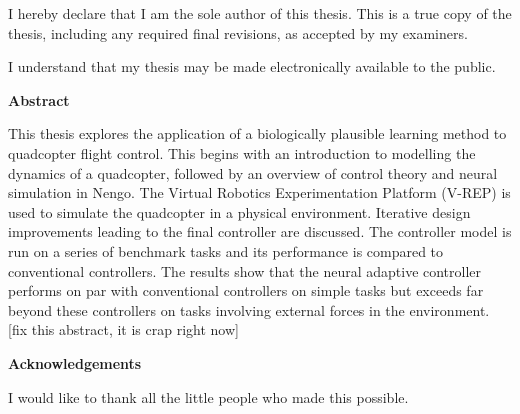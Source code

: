\cleardoublepage %
 


  \noindent
I hereby declare that I am the sole author of this thesis. This is a true copy of the thesis, including any required final revisions, as accepted by my examiners.

  \bigskip
  
  \noindent
I understand that my thesis may be made electronically available to the public.

\cleardoublepage


\begin{center}\textbf{Abstract}\end{center}

This thesis explores the application of a biologically plausible learning method to quadcopter flight control.
This begins with an introduction to modelling the dynamics of a quadcopter, followed by an overview of control theory and neural simulation in Nengo.
The Virtual Robotics Experimentation Platform (V-REP) is used to simulate the quadcopter in a physical environment.
Iterative design improvements leading to the final controller are discussed.
The controller model is run on a series of benchmark tasks and its performance is compared to conventional controllers. 
The results show that the neural adaptive controller performs on par with conventional controllers on simple tasks but exceeds far beyond these controllers on tasks involving external forces in the environment.
[fix this abstract, it is crap right now]

\cleardoublepage


\begin{center}\textbf{Acknowledgements}\end{center}

I would like to thank all the little people who made this possible.
\cleardoublepage

